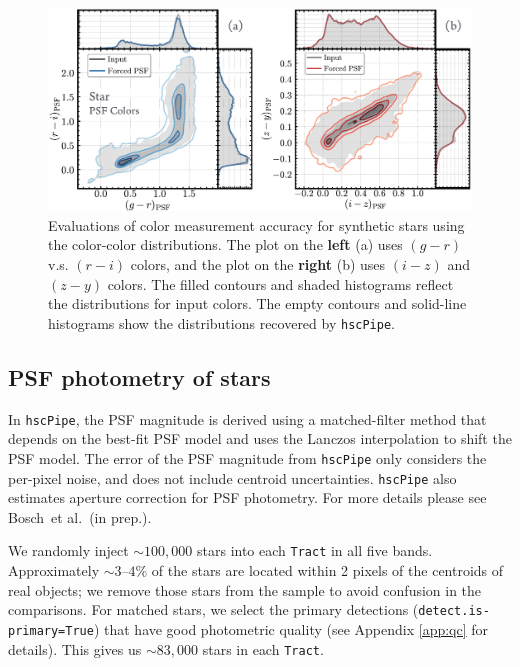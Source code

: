\documentclass[useamsfonts]{pasj01}
\def\etal{{\ et al.~}}
\def\hscpipe{\texttt{hscPipe}}
\def\tract{\texttt{Tract}}
\begin{document}
\begin{figure}
    \begin{center}
        \includegraphics[width=\textwidth]{fig/synpipe_psf_cdist}
    \end{center}
    \caption{
        Evaluations of color measurement accuracy for synthetic stars using
        the color-color distributions.
        The plot on the \textbf{left} (a) uses $(g-r)$ v.s. $(r-i)$ colors, and the plot 
        on the \textbf{right} (b) uses $(i-z)$ and $(z-y)$ colors.
        The filled contours and shaded histograms reflect the distributions for input
        colors.
        The empty contours and solid-line histograms show the distributions recovered
        by \hscpipe{}.
        }
    \label{fig:psf_cdist}
\end{figure}

\subsection{PSF photometry of stars}
    \label{ssec:psf}

    In \hscpipe{}, the PSF magnitude is derived using a matched-filter method that
    depends on the best-fit PSF model and uses the Lanczos interpolation to shift
    the PSF model.
    The error of the PSF magnitude from \hscpipe{} only considers the per-pixel noise,
    and does not include centroid uncertainties.
    \hscpipe{} also estimates aperture correction for PSF photometry.
    For more details please see Bosch\etal (in prep.).

    We randomly inject ${\sim}100,000$ stars into each \tract{} in all five bands. 
    Approximately ${\sim}3$--$4$\% of the stars are located within 2 pixels of the 
    centroids of real objects; we remove those stars from the sample to avoid confusion 
    in the comparisons.
    For matched stars, we select the primary detections 
    (\texttt{detect.is-primary=True}) that have good photometric quality
    (see Appendix \ref{app:qc} for details).
    This gives us ${\sim}83,000$ stars in each \tract{}.
\end{document}

